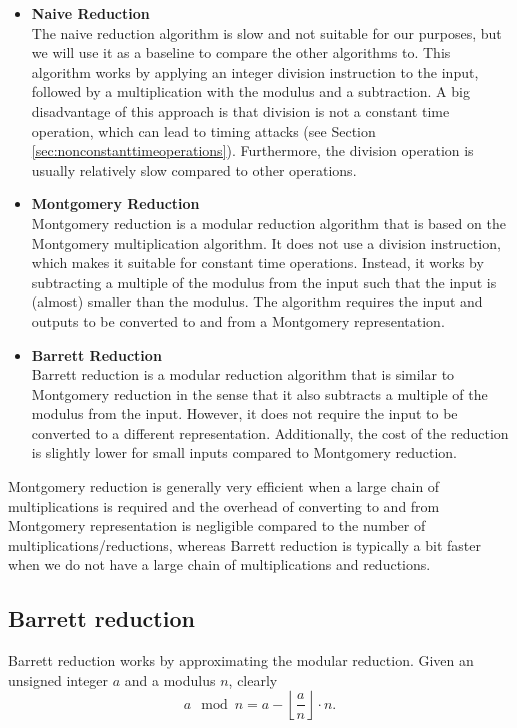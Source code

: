 \documentclass[11pt,a4paper]{report}
\theoremstyle{definition}
\begin{document}
\begin{itemize}
  \item \textbf{Naive Reduction}\\
  The naive reduction algorithm is slow and not suitable for our purposes, but we will use it as a baseline to compare the other algorithms to. This algorithm works by applying an integer division instruction to the input, followed by a multiplication with the modulus and a subtraction. A big disadvantage of this approach is that division is not a constant time operation, which can lead to timing attacks (see Section \ref{sec:nonconstanttimeoperations}). Furthermore, the division operation is usually relatively slow compared to other operations.
  \item \textbf{Montgomery Reduction}\\
  Montgomery reduction \cite{montgomery1985modular} is a modular reduction algorithm that is based on the Montgomery multiplication algorithm. It does not use a division instruction, which makes it suitable for constant time operations. Instead, it works by subtracting a multiple of the modulus from the input such that the input is (almost) smaller than the modulus. The algorithm requires the input and outputs to be converted to and from a Montgomery representation.
  \item \textbf{Barrett Reduction}\\
  Barrett reduction\cite{barrett1986implementing} is a modular reduction algorithm that is similar to Montgomery reduction in the sense that it also subtracts a multiple of the modulus from the input. However, it does not require the input to be converted to a different representation. Additionally, the cost of the reduction is slightly lower for small inputs compared to Montgomery reduction.
\end{itemize}

Montgomery reduction is generally very efficient when a large chain of multiplications is required and the overhead of converting to and from Montgomery representation is negligible compared to the number of multiplications/reductions, whereas Barrett reduction is typically a bit faster when we do not have a large chain of multiplications and reductions.

\subsection{Barrett reduction}
\label{sec:barrettreduction}
Barrett reduction works by approximating the modular reduction. Given an unsigned integer $a$ and a modulus $n$, clearly
\[
  a \mod n = a - \left\lfloor \frac{a}{n} \right\rfloor \cdot n.
\]
\end{document}
